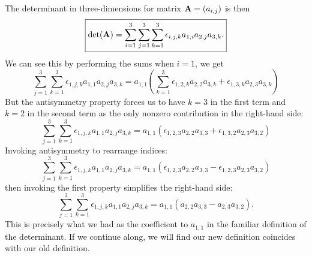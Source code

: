 The determinant in three-dimensions for matrix $\mathbf{A}=(a_{i,j})$ is then
\begin{equation}\label{eq:determinant:levi-civita:three-dim}
\boxed{\det(\mathbf{A}) = \sum^{3}_{i=1}\sum^{3}_{j=1}\sum^{3}_{k=1}
\epsilon_{i,j,k}a_{1,i}a_{2,j}a_{3,k}.}
\end{equation}
We can see this by performing the sums when $i=1$, we get
\begin{equation}
\sum^{3}_{j=1}\sum^{3}_{k=1}\epsilon_{1,j,k}a_{1,1}a_{2,j}a_{3,k}
=a_{1,1}\left(\sum^{3}_{k=1}\epsilon_{1,2,k}a_{2,2}a_{3,k}+\epsilon_{1,3,k}a_{2,3}a_{3,k}\right)
\end{equation}
But the antisymmetry property forces us to have $k=3$ in the first term
and $k=2$ in the second term as the only nonzero contribution in the
right-hand side:
\begin{equation}
\sum^{3}_{j=1}\sum^{3}_{k=1}\epsilon_{1,j,k}a_{1,1}a_{2,j}a_{3,k}
=a_{1,1}\left(\epsilon_{1,2,3}a_{2,2}a_{3,3}+\epsilon_{1,3,2}a_{2,3}a_{3,2}\right)
\end{equation}
Invoking antisymmetry to rearrange indices:
\begin{equation}
\sum^{3}_{j=1}\sum^{3}_{k=1}\epsilon_{1,j,k}a_{1,1}a_{2,j}a_{3,k}
=a_{1,1}\left(\epsilon_{1,2,3}a_{2,2}a_{3,3}-\epsilon_{1,2,3}a_{2,3}a_{3,2}\right)
\end{equation}
then invoking the first property simplifies the right-hand side:
\begin{equation}
\sum^{3}_{j=1}\sum^{3}_{k=1}\epsilon_{1,j,k}a_{1,1}a_{2,j}a_{3,k}
=a_{1,1}\left(a_{2,2}a_{3,3}-a_{2,3}a_{3,2}\right).
\end{equation}
This is precisely what we had as the coefficient to $a_{1,1}$ in the
familiar definition of the determinant. If we continue along, we will
find our new definition coincides with our old definition.


